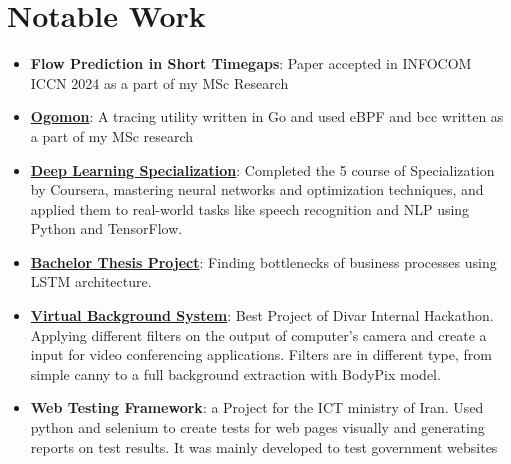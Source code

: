 \documentclass[letterpaper,11pt]{article}
\newcommand{\resumeItem}[2]{
  \item\small{
    \textbf{#1}{: #2 \vspace{-2pt}}
  }
}
\newcommand{\resumeSubItem}[2]{\resumeItem{#1}{#2}\vspace{-4pt}}
\newcommand{\resumeSubHeadingListStart}{\begin{itemize}[leftmargin=*]}
\newcommand{\resumeSubHeadingListEnd}{\end{itemize}}
\begin{document}
\section{Notable Work}
  \resumeSubHeadingListStart
    \resumeSubItem{Flow Prediction in Short Timegaps}
    {Paper accepted in INFOCOM ICCN 2024 as a part of my MSc Research}
    \resumeSubItem{\href{https://github.com/mory91/ogomon}{Ogomon}}
    {A tracing utility written in Go and used eBPF and bcc written as a part of my MSc research}
    \resumeSubItem{\href{https://www.coursera.org/account/accomplishments/specialization/certificate/T9ULQAUEZ68D}{Deep Learning Specialization}}
    {Completed the 5 course of Specialization by Coursera, mastering neural networks and optimization techniques, and applied them to real-world tasks like speech recognition and NLP using Python and TensorFlow.}
    \resumeSubItem{\href{https://github.com/mory91/bthesis}{Bachelor Thesis Project}}
    {Finding bottlenecks of business processes using LSTM architecture.}
    \resumeSubItem{\href{https://github.com/mory91/vbs}{Virtual Background System}} %
    {Best Project of Divar Internal Hackathon. Applying different filters on the output of computer's camera and create a input for video conferencing applications. Filters are in different type, from simple canny to a full background extraction with BodyPix model. }
    \resumeSubItem{Web Testing Framework}
    {a Project for the ICT ministry of Iran. Used python and selenium to create tests for web pages visually and generating reports on test results. It was mainly developed to test government websites}
  \resumeSubHeadingListEnd

\end{document}
